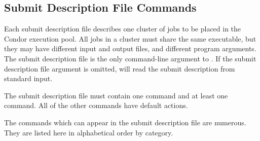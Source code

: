 \subsection{\label{sec:submit-cmds}Submit Description File Commands}  

Each submit description file describes one cluster of jobs to be
placed in the Condor execution pool. All jobs in a cluster must share
the same executable, but they may have different input and output files,
and different program arguments. The submit description file is
the only command-line argument to . If the submit description
file argument is omitted,  will read the submit description
from standard input.

The submit description file must contain 
one  command and at least one  command.
All of the other commands have default actions.

The commands which can appear in the submit description file are
numerous.  They are listed here in alphabetical order by category.

